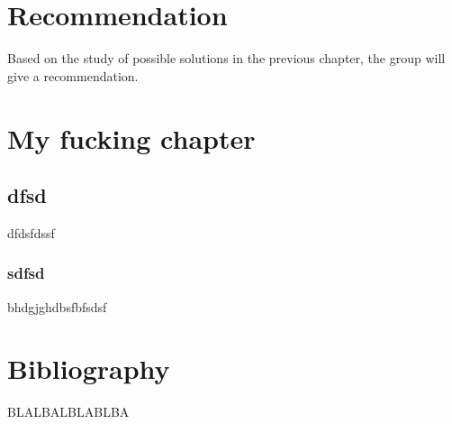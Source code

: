 \documentclass[11pt,a4paper,titlepage,oneside]{report}
\begin{document}
\chapter{Recommendation}
Based on the study of possible solutions in the previous chapter, the group will give a recommendation.

\chapter{My fucking chapter}
\section{dfsd}
dfdsfdssf
\subsection{sdfsd}
bhdgjghdbsfbfsdsf


\chapter{Bibliography}

\begin{flushleft}
	
	 BLALBALBLABLBA
\end{flushleft}

\appendix
\end{document}
